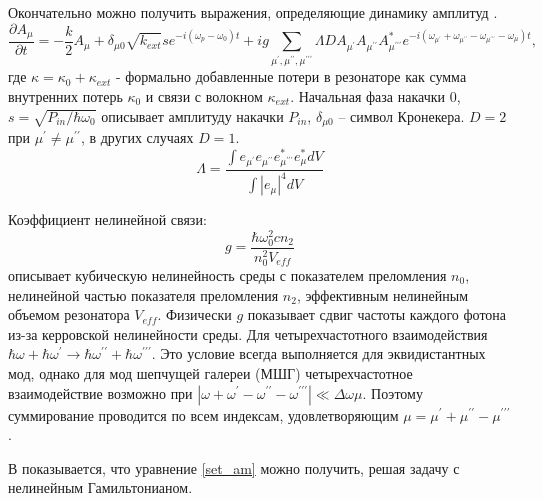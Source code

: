 Окончательно можно получить выражения, определяющие динамику амплитуд \cite{MLG_nature_2012}\cite{Chembo_modal}.
\begin{equation}\label{set_am}
\frac{\partial A_\mu}{\partial t}=-\frac{k}{2}A_\mu+\delta_{\mu 0}\sqrt{k_{ext}}se^{-i(\omega_p-\omega_0)t}+ig\sum_{\mu^\prime,\mu^{\prime\prime},\mu^{\prime\prime\prime}} \Lambda D A_{\mu^\prime}A_{\mu^{\prime\prime}}A_{\mu^{\prime\prime\prime}}^*e^{-i(\omega_{\mu^\prime}+\omega_{\mu^{\prime\prime}}-\omega_{\mu^{\prime\prime\prime}}-\omega_\mu)t},
\end{equation}
где $\kappa=\kappa_0+\kappa_{ext}$ - формально добавленные потери в резонаторе как сумма внутренних потерь $\kappa_0$ и связи с волокном $\kappa_{ext}$. Начальная фаза накачки $0$, $s=\sqrt{P_{in}/\hbar\omega_0}$ описывает амплитуду накачки $P_{in}$, $\delta_{\mu0}$ -- символ Кронекера. $D=2$ при $\mu^\prime\neq\mu^{\prime\prime}$, в других случаях $D=1$.
\begin{equation}
\Lambda=\frac{\int e_{\mu^\prime}e_{\mu^{\prime\prime}}e_{\mu^{\prime\prime\prime}}^*e_\mu^*dV}{\int|e_\mu|^4dV}
\end{equation}

Коэффициент нелинейной связи:
\begin{equation}
g=\frac{\hbar\omega_0^2cn_2}{n_0^2V_{eff}}
\end{equation}
описывает кубическую нелинейность среды с показателем преломления $n_0$, нелинейной частью показателя преломления $n_2$, эффективным нелинейным объемом резонатора $V_{eff}$. Физически $g$ показывает сдвиг частоты каждого фотона из-за керровской нелинейности среды. Для четырехчастотного взаимодействия $\hbar\omega+\hbar\omega^\prime\rightarrow\hbar\omega^{\prime\prime}+\hbar\omega^{\prime\prime\prime}$. Это условие всегда выполняется для эквидистантных мод, однако для мод шепчущей галереи (МШГ) четырехчастотное взаимодействие возможно при $|\omega+\omega^\prime-\omega^{\prime\prime}-\omega^{\prime\prime\prime}|\ll\Delta\omega\mu$. Поэтому суммирование проводится по всем индексам, удовлетворяющим $\mu=\mu^\prime+\mu^{\prime\prime}-\mu^{\prime\prime\prime}$.

В \cite{Matsko} показывается, что уравнение \eqref{set_am} можно получить, решая задачу с нелинейным Гамильтонианом.

